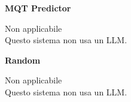 \par\vspace{0.45cm}\begin{minipage}[t]{0.49\linewidth}\centering
{\large\bfseries MQT Predictor}\par\smallskip
\parbox[c][6.1cm][c]{\linewidth}{\centering\large Non applicabile\\[5pt]\normalsize Questo sistema non usa un LLM.}
\end{minipage}
\hfill\begin{minipage}[t]{0.49\linewidth}\centering
{\large\bfseries Random}\par\smallskip
\parbox[c][6.1cm][c]{\linewidth}{\centering\large Non applicabile\\[5pt]\normalsize Questo sistema non usa un LLM.}
\end{minipage}
\par\vspace{0.45cm}
